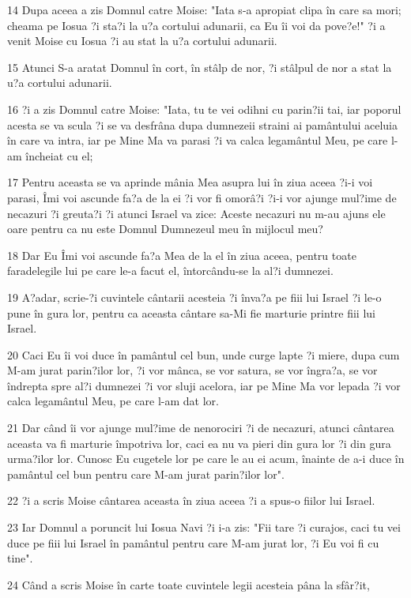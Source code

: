 \par 14 Dupa aceea a zis Domnul catre Moise: "Iata s-a apropiat clipa în care sa mori; cheama pe Iosua ?i sta?i la u?a cortului adunarii, ca Eu îi voi da pove?e!" ?i a venit Moise cu Iosua ?i au stat la u?a cortului adunarii.
\par 15 Atunci S-a aratat Domnul în cort, în stâlp de nor, ?i stâlpul de nor a stat la u?a cortului adunarii.
\par 16 ?i a zis Domnul catre Moise: "Iata, tu te vei odihni cu parin?ii tai, iar poporul acesta se va scula ?i se va desfrâna dupa dumnezeii straini ai pamântului aceluia în care va intra, iar pe Mine Ma va parasi ?i va calca legamântul Meu, pe care l-am încheiat cu el;
\par 17 Pentru aceasta se va aprinde mânia Mea asupra lui în ziua aceea ?i-i voi parasi, Îmi voi ascunde fa?a de la ei ?i vor fi omorâ?i ?i-i vor ajunge mul?ime de necazuri ?i greuta?i ?i atunci Israel va zice: Aceste necazuri nu m-au ajuns ele oare pentru ca nu este Domnul Dumnezeul meu în mijlocul meu?
\par 18 Dar Eu Îmi voi ascunde fa?a Mea de la el în ziua aceea, pentru toate faradelegile lui pe care le-a facut el, întorcându-se la al?i dumnezei.
\par 19 A?adar, scrie-?i cuvintele cântarii acesteia ?i înva?a pe fiii lui Israel ?i le-o pune în gura lor, pentru ca aceasta cântare sa-Mi fie marturie printre fiii lui Israel.
\par 20 Caci Eu îi voi duce în pamântul cel bun, unde curge lapte ?i miere, dupa cum M-am jurat parin?ilor lor, ?i vor mânca, se vor satura, se vor îngra?a, se vor îndrepta spre al?i dumnezei ?i vor sluji acelora, iar pe Mine Ma vor lepada ?i vor calca legamântul Meu, pe care l-am dat lor.
\par 21 Dar când îi vor ajunge mul?ime de nenorociri ?i de necazuri, atunci cântarea aceasta va fi marturie împotriva lor, caci ea nu va pieri din gura lor ?i din gura urma?ilor lor. Cunosc Eu cugetele lor pe care le au ei acum, înainte de a-i duce în pamântul cel bun pentru care M-am jurat parin?ilor lor".
\par 22 ?i a scris Moise cântarea aceasta în ziua aceea ?i a spus-o fiilor lui Israel.
\par 23 Iar Domnul a poruncit lui Iosua Navi ?i i-a zis: "Fii tare ?i curajos, caci tu vei duce pe fiii lui Israel în pamântul pentru care M-am jurat lor, ?i Eu voi fi cu tine".
\par 24 Când a scris Moise în carte toate cuvintele legii acesteia pâna la sfâr?it,
